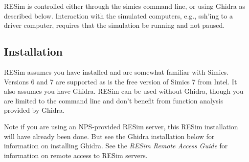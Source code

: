 \documentclass[titlepage]{article}
\begin{document}
RESim is controlled either through the simics command line, or using Ghidra as described below.  Interaction with the simulated
computers, e.g., ssh'ing to a driver computer, requires that the simulation be running and not paused.

\subsection{Installation}
\label{installation}
RESim assumes you have installed and are somewhat familiar with Simics.  Versions  6 and 7 are supported
as is the free version of Simics 7 from Intel. 
It also assumes you have Ghidra. 
RESim can be used without Ghidra, though you are limited to the command line and don't benefit from
function analysis provided by Ghidra.

Note if you are using an NPS-provided RESim server, this RESim installation will have already been done.  But
see the Ghidra installation below for information on installing Ghidra. 
See the \textit{RESim Remote Access Guide} for information on remote access to RESim
servers.  
\end{document}
